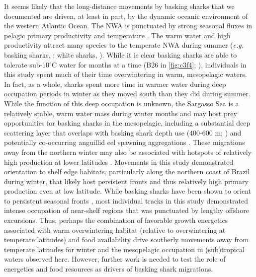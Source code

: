 It seems likely that the long-distance movements by basking sharks that we documented are driven, at least in part, by the dynamic oceanic environment of the western Atlantic Ocean. The NWA is punctuated by strong seasonal fluxes in pelagic primary productivity \citep{Miller2012} and temperature \citep{Talley2011}. The warm water and high productivity attract many species to the temperate NWA during summer (\emph{e.g.} basking sharks, \citealt{Curtis2014}; white sharks, \citealt{Skomal2017a}). While it is clear basking sharks are able to tolerate sub-10$^{\circ}$C water for months at a time (B26 in \cref{fig:c3f4}; \citealt{Sims2008}), individuals in this study spent much of their time overwintering in warm, mesopelagic waters. In fact, as a whole, sharks spent more time in warmer water during deep occupation periods in winter as they moved south than they did during summer. While the function of this deep occupation is unknown, the Sargasso Sea is a relatively stable, warm water mass during winter months and may host prey opportunities for basking sharks in the mesopelagic, including a substantial deep scattering layer that overlaps with basking shark depth use (400-600 m; \citealt{Irigoien2014}) and potentially co-occurring anguillid eel spawning aggregations \citep{Wysujack2015}. These migrations away from the northern winter may also be associated with hotspots of relatively high production at lower latitudes \citep[\emph{e.g.} Brazilian shelf; ][]{Mourato2014}. Movements in this study demonstrated orientation to shelf edge habitats, particularly along the northern coast of Brazil during winter, that likely host persistent fronts \citep{LeFevre1987,Sims2008} and thus relatively high primary production even at low latitude. While basking sharks have been shown to orient to persistent seasonal fronts \citep{Miller2015}, most individual tracks in this study demonstrated intense occupation of near-shelf regions that was punctuated by lengthy offshore excursions. Thus, perhaps the combination of favorable growth energetics associated with warm overwintering habitat (relative to overwintering at temperate latitudes) and food availability drive southerly movements away from temperate latitudes for winter and the mesopelagic occupation in (sub)tropical waters observed here. However, further work is needed to test the role of energetics and food resources as drivers of basking shark migrations.

